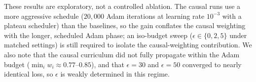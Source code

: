 These results are exploratory, not a controlled ablation.  The causal
runs use a more aggressive schedule ($20{,}000$ Adam iterations at
learning rate $10^{-3}$ with a plateau scheduler) than the baselines, so
the gain conflates the causal weighting with the longer, scheduled Adam
phase; an iso-budget sweep ($\epsilon\in\{0,2,5\}$ under matched settings)
is still required to isolate the causal-weighting contribution.
We also note that the causal curriculum did not fully propagate within the
Adam budget ($\min_i w_i\approx0.77$--$0.85$), and that $\epsilon=30$ and
$\epsilon=50$ converged to nearly identical loss, so $\epsilon$ is weakly
determined in this regime.

